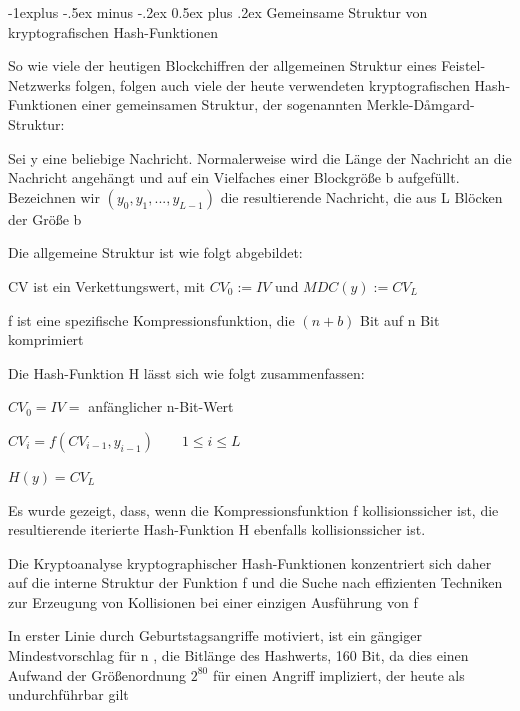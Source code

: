 \documentclass[a4paper]{article}
\makeatletter
\renewcommand{\subsection}{\@startsection{subsection}{2}{0mm}%
 {-1explus -.5ex minus -.2ex}%
 {0.5ex plus .2ex}%
 {\normalfont\normalsize\bfseries}}
\makeatother
\begin{document}
\begin{multicols}{3}
      \subsection{Gemeinsame Struktur von kryptografischen Hash-Funktionen}
      \begin{itemize*}
            \item So wie viele der heutigen Blockchiffren der allgemeinen Struktur eines Feistel-Netzwerks folgen, folgen auch viele der heute verwendeten kryptografischen Hash-Funktionen einer gemeinsamen Struktur, der sogenannten Merkle-Dåmgard-Struktur:
            \begin{itemize*}
                  \item Sei y eine beliebige Nachricht. Normalerweise wird die Länge der Nachricht an die Nachricht angehängt und auf ein Vielfaches einer Blockgröße b aufgefüllt. Bezeichnen wir $(y_0,y_1,...,y_{L-1})$ die resultierende Nachricht, die aus L Blöcken der Größe b
                  \item Die allgemeine Struktur ist wie folgt abgebildet: %
                  \item CV ist ein Verkettungswert, mit $CV_0:= IV$ und $MDC(y) := CV_L$
                  \item f ist eine spezifische Kompressionsfunktion, die $(n+b)$ Bit auf n Bit komprimiert
            \end{itemize*}
            \item Die Hash-Funktion H lässt sich wie folgt zusammenfassen:
            \begin{itemize*}
                  \item $CV_0 = IV =$ anfänglicher n-Bit-Wert
                  \item $CV_i = f(CV_{i -1}, y_{i-1}) \quad\quad 1\leq i \leq L$
                  \item $H(y) = CV_L$
            \end{itemize*}
            \item Es wurde gezeigt, dass, wenn die Kompressionsfunktion f kollisionssicher ist, die resultierende iterierte Hash-Funktion H ebenfalls kollisionssicher ist.
            \item Die Kryptoanalyse kryptographischer Hash-Funktionen konzentriert sich daher auf die interne Struktur der Funktion f und die Suche nach effizienten Techniken zur Erzeugung von Kollisionen bei einer einzigen Ausführung von f
            \item In erster Linie durch Geburtstagsangriffe motiviert, ist ein gängiger Mindestvorschlag für n , die Bitlänge des Hashwerts, 160 Bit, da dies einen Aufwand der Größenordnung $2^{80}$ für einen Angriff impliziert, der heute als undurchführbar gilt
      \end{itemize*}


\end{multicols}
\end{document}
